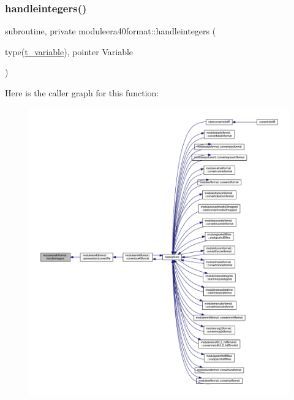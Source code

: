 \subsubsection{\texorpdfstring{handleintegers()}{handleintegers()}}
{\footnotesize\ttfamily subroutine, private moduleera40format\+::handleintegers (\begin{DoxyParamCaption}\item[{type(\mbox{\hyperlink{structmoduleera40format_1_1t__variable}{t\+\_\+variable}}), pointer}]{Variable }\end{DoxyParamCaption})\hspace{0.3cm}{\ttfamily [private]}}

Here is the caller graph for this function\+:\nopagebreak
\begin{figure}[H]
\begin{center}
\leavevmode
\includegraphics[width=350pt]{namespacemoduleera40format_a90dfe4450bbbd59c764d529d05f92d76_icgraph}
\end{center}
\end{figure}
\mbox{\label{namespacemoduleera40format_a0a0c22e410451c81e0c573ad2174504f}} 
